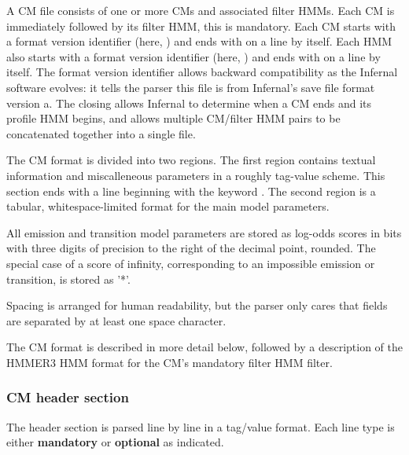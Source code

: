 A CM file consists of one or more CMs and associated filter
HMMs. Each CM is immediately followed by its filter HMM, this is
mandatory. Each CM starts with a format version identifier (here,
) and ends with \prog{//} on a line by itself. Each
HMM also starts with a format version identifier (here,
) and ends with \prog{//} on a line by itself.  The
format version identifier allows backward compatibility as the
Infernal software evolves: it tells the parser this file is from
Infernal's save file format version a. The closing \prog{//} allows
Infernal to determine when a CM ends and its profile HMM begins, and
allows multiple CM/filter HMM pairs to be concatenated together into a
single file.

The CM format is divided into two regions. The first region contains
textual information and miscalleneous parameters in a roughly
tag-value scheme. This section ends with a line beginning with the
keyword . The second region is a tabular, whitespace-limited
format for the main model parameters.

All emission and transition model parameters are stored as log-odds
scores in bits with three digits of precision to the right of the
decimal point, rounded. 
The special case of a score of infinity, corresponding to an
impossible emission or transition, is stored as '*'.

Spacing is arranged for human readability, but the parser only cares
that fields are separated by at least one space character.

The CM format is described in more detail below, followed by a
description of the HMMER3 HMM format for the CM's mandatory filter HMM
filter.

\subsubsection{CM header section}

The header section is parsed line by line in a tag/value format. Each
line type is either \textbf{mandatory} or \textbf{optional} as
indicated. 

